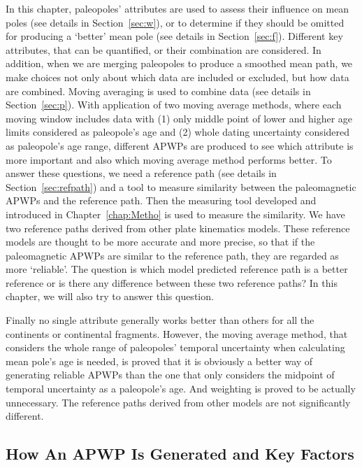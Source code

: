 In this chapter, paleopoles' attributes are used to assess their influence on
mean poles (see details in Section~\ref{sec:w}), or to determine if they should
be omitted for producing a `better' mean pole (see details in
Section~\ref{sec:f}). Different key attributes, that can be quantified, or their
combination are considered. In addition, when we are merging paleopoles to
produce a smoothed mean path, we make choices not only about which data are
included or excluded, but how data are combined. Moving averaging is used to
combine data (see details in Section~\ref{sec:p}). With application of two
moving average methods, where each moving window includes data with (1) only
middle point of lower and higher age limits considered as paleopole's age and
(2) whole dating uncertainty considered as paleopole's age range, different
APWPs are produced to see which attribute is more important and also which
moving average method performs better. To answer these questions, we need a
reference path (see details in Section~\ref{sec:refpath}) and a tool to measure
similarity between the paleomagnetic APWPs and the reference path. Then the
measuring tool developed and introduced in Chapter~\ref{chap:Metho} is used to
measure the similarity. We have two reference paths derived from other plate
kinematics models. These reference models are thought to be more accurate and
more precise, so that if the paleomagnetic APWPs are similar to the reference
path, they are regarded as more `reliable'. The question is which model
predicted reference path is a better reference or is there any difference
between these two reference paths? In this chapter, we will also try to answer
this question.

Finally no single attribute generally works better than others for all the
continents or continental fragments. However, the moving average method, that
considers the whole range of paleopoles' temporal uncertainty when calculating
mean pole's age is needed, is proved that it is obviously a better way of
generating reliable APWPs than the one that only considers the midpoint of
temporal uncertainty as a paleopole's age. And weighting is proved to be
actually unnecessary. The reference paths derived from other models are not
significantly different.

\subsection{How An APWP Is Generated and Key Factors}

